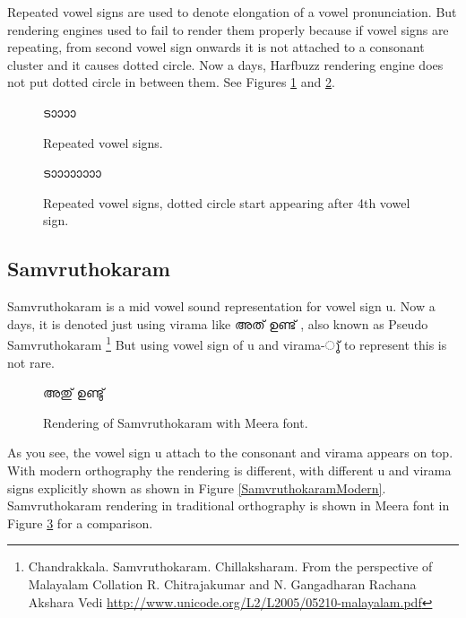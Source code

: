 Repeated vowel signs are used to denote elongation of a vowel pronunciation.
But rendering engines used to fail to render them properly because if vowel
signs are repeating, from second vowel sign onwards it is not attached to a
consonant cluster and it causes dotted circle. Now a days, Harfbuzz rendering
engine does not put dotted circle in between them. See Figures
\ref{elongatedvowel-dotted} and \ref{elongated-nodotted}.

\begin{figure}[h]
  \centering
  {\meera\textexample ടാാാാ}\\
  \caption{Repeated vowel signs.}
  \label{elongatedvowel-dotted}
\end{figure}

\begin{figure}[h]
  \centering
  {\meera\textexample ടാാാാാാാാ}\\
  \caption{Repeated vowel signs, dotted circle start appearing after 4th vowel sign.}
  \label{elongated-nodotted}
\end{figure}


\subsection {Samvruthokaram}
\label{Samvruthokaram}
Samvruthokaram is a mid vowel sound representation for vowel sign u. Now a
days, it is denoted just using virama like {\malayalam അത് ഉണ്ട് }, also known as
Pseudo Samvruthokaram
\footnote{Chandrakkala. Samvruthokaram. Chillaksharam.
From the perspective of Malayalam Collation
R. Chitrajakumar and N. Gangadharan
Rachana Akshara Vedi \url{http://www.unicode.org/L2/L2005/05210-malayalam.pdf}}
But using vowel sign of u and virama-{\malayalam ു്} to represent this is not
rare.

\begin{figure}[h!]
  \centering
  {\meera\textexample  അതു് ഉണ്ടു് }\\
  \caption{Rendering of Samvruthokaram with Meera font.}
  \label{SamvruthokaramTraditional}
\end{figure}

As you see, the vowel sign u attach to the consonant and virama appears on top.
With modern orthography the rendering is different, with different u and virama
signs explicitly shown as shown in Figure \ref{SamvruthokaramModern}.
Samvruthokaram rendering in traditional orthography is shown in Meera font in
Figure \ref{SamvruthokaramTraditional} for a comparison.

